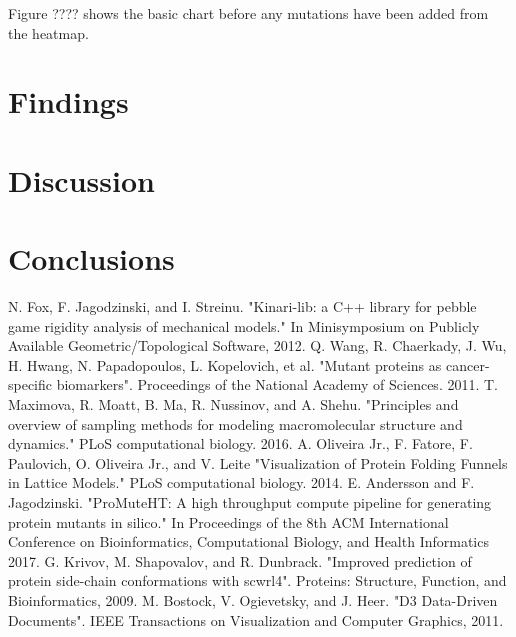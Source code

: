 \documentclass[11pt]{IEEEtran}
\begin{document}
Figure ???? shows the basic chart before any mutations have been added from the heatmap.


\section{Findings}


\section{Discussion}

\section{Conclusions}




\begin{thebibliography}{00}
 N. Fox, F. Jagodzinski, and I. Streinu. "Kinari-lib: a C++ library for pebble game rigidity analysis of mechanical models." In Minisymposium on Publicly Available Geometric/Topological Software, 2012.
 Q. Wang, R. Chaerkady, J. Wu, H. Hwang, N. Papadopoulos, L. Kopelovich, et al. "Mutant proteins as cancer-specific biomarkers". Proceedings of the National Academy of Sciences. 2011.
 T. Maximova, R. Moatt, B. Ma, R. Nussinov, and A. Shehu. "Principles and overview of sampling methods for modeling macromolecular structure and dynamics." PLoS computational biology. 2016.
 A. Oliveira Jr., F. Fatore, F. Paulovich, O. Oliveira Jr., and V. Leite  "Visualization of Protein Folding Funnels in Lattice Models." PLoS computational biology. 2014.
 E. Andersson and F. Jagodzinski. "ProMuteHT: A high throughput compute pipeline for generating protein mutants in silico." In Proceedings of the
8th ACM International Conference on Bioinformatics, Computational Biology, and Health Informatics 2017.
 G. Krivov, M. Shapovalov, and R. Dunbrack. "Improved prediction of protein side-chain conformations with scwrl4". Proteins: Structure,
Function, and Bioinformatics, 2009.
 M. Bostock, V. Ogievetsky, and J. Heer. "D3 Data-Driven Documents". IEEE Transactions on Visualization and Computer Graphics, 2011.	



\end{thebibliography}
\end{document}
